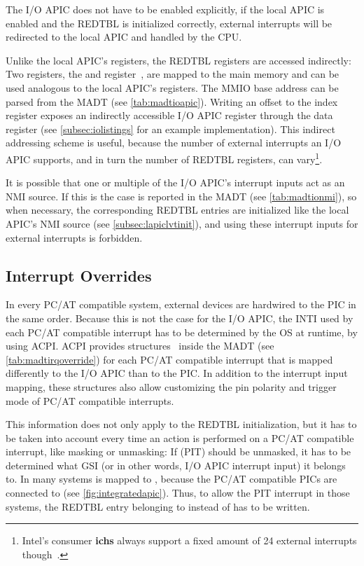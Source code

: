 The I/O APIC does not have to be enabled explicitly, if the local APIC is enabled and the REDTBL is initialized correctly, external interrupts will be redirected to the local APIC and handled by the CPU\@.

Unlike the local APIC's registers, the REDTBL registers are accessed indirectly: Two registers, the  and  register~\autocite[sec.~9.5.1]{ich5}, are mapped to the main memory and can be used analogous to the local APIC's registers.
The MMIO base address can be parsed from the MADT (see \autoref{tab:madtioapic}).
Writing an offset to the index register exposes an indirectly accessible I/O APIC register through the data register (see \autoref{subsec:iolistings} for an example implementation).
This indirect addressing scheme is useful, because the number of external interrupts an I/O APIC supports, and in turn the number of REDTBL registers, can vary\footnote{
  Intel's consumer \textbf{\glspl{ich}} always support a fixed amount of 24 external interrupts though~\autocite[sec.~9.5.7]{ich5}.}.

It is possible that one or multiple of the I/O APIC's interrupt inputs act as an NMI source.
If this is the case is reported in the MADT (see \autoref{tab:madtionmi}), so when necessary, the corresponding REDTBL entries are initialized like the local APIC's NMI source (see \autoref{subsec:lapiclvtinit}), and using these interrupt inputs for external interrupts is forbidden.

\subsection{Interrupt Overrides}
\label{subsec:ioapicpcat}

In every PC/AT compatible system, external devices are hardwired to the PIC in the same order.
Because this is not the case for the I/O APIC, the INTI used by each PC/AT compatible interrupt has to be determined by the OS at runtime, by using ACPI\@.
ACPI provides  structures~\autocite[sec.~5.2.8.3.1]{acpi1} inside the MADT (see \autoref{tab:madtirqoverride}) for each PC/AT compatible interrupt that is mapped differently to the I/O APIC than to the PIC\@.
In addition to the interrupt input mapping, these structures also allow customizing the pin polarity and trigger mode of PC/AT compatible interrupts.

This information does not only apply to the REDTBL initialization, but it has to be taken into account every time an action is performed on a PC/AT compatible interrupt, like masking or unmasking: If  (PIT) should be unmasked, it has to be determined what GSI (or in other words, I/O APIC interrupt input) it belongs to.
In many systems  is mapped to , because the PC/AT compatible PICs are connected to  (see \autoref{fig:integratedapic}).
Thus, to allow the PIT interrupt in those systems, the REDTBL entry belonging to  instead of  has to be written.

